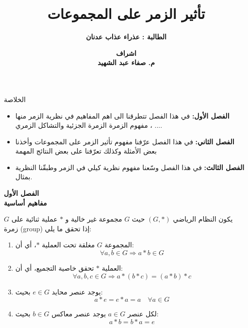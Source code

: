 



	\author{\textbf{الطالبة : عذراء عذاب عدنان}}
	\title{\textbf{تأثير الزمر على المجموعات}}
	\date{\textbf{اشراف\\
			 م. صفاء عبد الشهيد}}
	
		
		\begin{frame}
			\maketitle
		\end{frame}
		
		\begin{frame}{الخلاصة}
			\begin{itemize}
				\item \textbf{الفصل الأول:} في هذا الفصل تتطرقنا الى اهم المفاهيم في نظرية الزمر منها مفهوم الزمرة الزمرة الجزئية والتشاكل الزمري ، ....\\
				\item \textbf{الفصل الثاني:} في هذا الفصل عرّفنا مفهوم تأثير الزمر على المجموعات وأخذنا بعض الأمثلة وكذلك تعرّفنا على بعض النتائج المهمة\\
				\item \textbf{الفصل الثالث:} في هذا الفصل وسّعنا مفهوم نظرية كيلي في الزمر وطبقّنا النظرية بمثال.
			\end{itemize}
		\end{frame}
		
		\begin{frame}
			\begin{center}
				\Huge
				\textbf{الفصل الأول}\\
				\textbf{مفاهيم أساسية}
			\end{center}
		\end{frame}
		
		\begin{frame}
			\begin{definition}[الزمرة]
				يكون النظام الرياضي $(G, *)$ حيث $G$ مجموعة غير خالية و $*$ عملية ثنائية على $G$ زمرة (group) إذا تحقق ما يلي:
				\begin{enumerate}
					\item المجموعة $G$ مغلقة تحت العملية $*$، أي أن:
					\[
					\forall a, b \in G \Rightarrow a * b \in G
					\]
					
					\item العملية $*$ تحقق خاصية التجميع، أي أن:
					\[
					\forall a, b, c \in G \Rightarrow a * (b * c) = (a * b) * c
					\]
					
					\item يوجد عنصر محايد $e \in G$ بحيث:
					\[
					a * e = e * a = a \quad \forall a \in G
					\]
					
					\item لكل عنصر $a \in G$ يوجد عنصر معاكس $b \in G$ بحيث:
					\[
					a * b = b * a = e
					\]	
				\end{enumerate}
			\end{definition}
		\end{frame}
		
